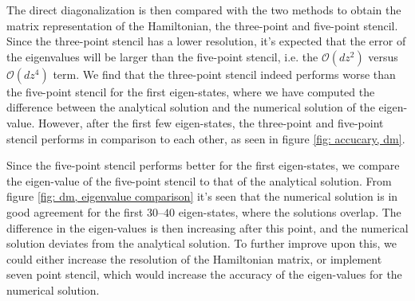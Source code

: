 \documentclass[a4paper]{article}
\newcommand{\newparagraph}{\vspace{.5cm}\noindent}
\begin{document}
\newparagraph
The direct diagonalization is then compared with the two methods to obtain the matrix representation of the Hamiltonian, the three-point and five-point stencil.
Since the three-point stencil has a lower resolution, it's expected that the error of the eigenvalues will be larger than the five-point stencil, i.e. the $\mathcal{O}(dz^2)$ versus $\mathcal{O}(dz^4)$ term.
We find that the three-point stencil indeed performs worse than the five-point stencil for the first eigen-states, where we have computed the difference between the analytical solution and the numerical solution of the eigen-value.
However, after the first few eigen-states, the three-point and five-point stencil performs in comparison to each other, as seen in figure \ref{fig: accucary, dm}.

\newparagraph
Since the five-point stencil performs better for the first eigen-states, we compare the eigen-value of the five-point stencil to that of the analytical solution.
From figure \ref{fig: dm, eigenvalue comparison} it's seen that the numerical solution is in good agreement for the first $30$--$40$ eigen-states, where the solutions overlap.
The difference in the eigen-values is then increasing after this point, and the numerical solution deviates from the analytical solution.
To further improve upon this, we could either increase the resolution of the Hamiltonian matrix, or implement seven point stencil, which would increase the accuracy of the eigen-values for the numerical solution.
\end{document}
